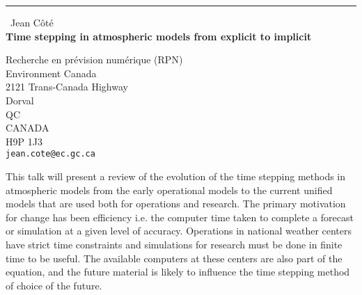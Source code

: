 \documentclass{report}
\begin{document}
\begin{center}
\rule{6in}{1pt} \
{\large Jean C\^ot\'e \\
{\bf Time stepping in atmospheric models from explicit to implicit }}

Recherche en pr\'evision num\'erique (RPN) \\ Environment Canada \\ 2121 Trans-Canada Highway \\ Dorval \\ QC \\ CANADA \\ H9P 1J3
\\
{\tt jean.cote@ec.gc.ca}\end{center}

This talk will present a review of the evolution of the time stepping
methods in atmospheric models from the early operational models to the
current unified models that are used both for operations and research.
The primary motivation for change has been efficiency i.e. the computer
time taken to complete a forecast or simulation at a given level of
accuracy. Operations in national weather centers have strict time
constraints and simulations for research must be done in finite time to
be useful. The available computers at these centers are also part of the
equation, and the future material is likely to influence the time
stepping method of choice of the future.
\end{document}
